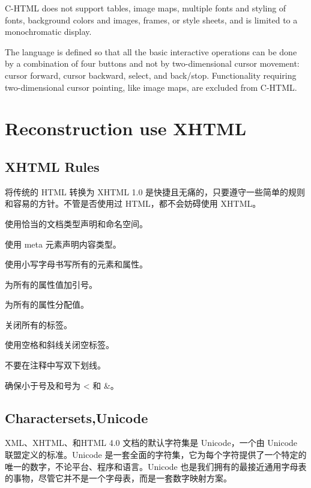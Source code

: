 C-HTML does not support tables, image maps, multiple fonts and styling of fonts, background colors and images, frames, or style sheets, and is limited to a monochromatic display.


The language is defined so that all the basic interactive operations can be done by a combination of four buttons and not by two-dimensional cursor movement: cursor forward, cursor backward, select, and back/stop. Functionality requiring two-dimensional cursor pointing, like image maps, are excluded from C-HTML.




\chapter{Reconstruction use XHTML}





\section{XHTML Rules}


将传统的 HTML 转换为 XHTML 1.0 是快捷且无痛的，只要遵守一些简单的规则和容易的方针。不管是否使用过 HTML，都不会妨碍使用 XHTML。

\begin{compactitem}
\item 使用恰当的文档类型声明和命名空间。
\item 使用 meta 元素声明内容类型。
\item 使用小写字母书写所有的元素和属性。
\item 为所有的属性值加引号。
\item 为所有的属性分配值。
\item 关闭所有的标签。
\item 使用空格和斜线关闭空标签。
\item 不要在注释中写双下划线。
\item 确保小于号及和号为 < 和 \&。
\end{compactitem}



\section{Charactersets,Unicode}

XML、XHTML、和HTML 4.0 文档的默认字符集是 Unicode，一个由 Unicode 联盟定义的标准。Unicode 是一套全面的字符集，它为每个字符提供了一个特定的唯一的数字，不论平台、程序和语言。Unicode 也是我们拥有的最接近通用字母表的事物，尽管它并不是一个字母表，而是一套数字映射方案。

